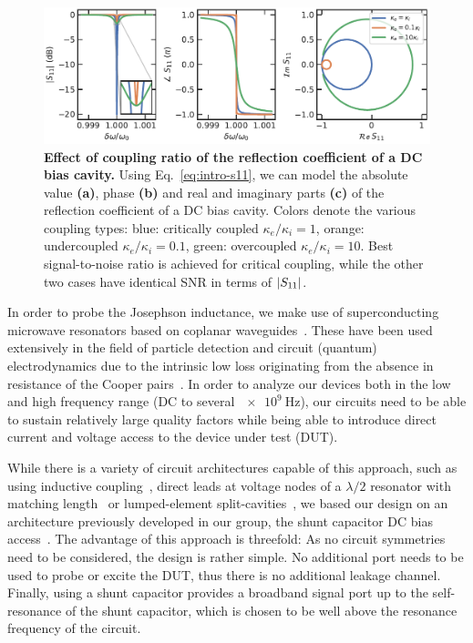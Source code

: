 \begin{figure}[t]
	\centering
	\includegraphics[width=\linewidth]{chapter-introduction/figs/model_DC_bias_cavity_coupling.pdf}
	\caption{
		\textbf{Effect of coupling ratio of the reflection coefficient of a DC bias cavity.}
		Using Eq.~\ref{eq:intro-s11}, we can model the absolute value \textbf{(a)}, phase \textbf{(b)} and real and imaginary parts \textbf{(c)} of the reflection coefficient of a DC bias cavity.
		Colors denote the various coupling types: blue: critically coupled $\kappa_e/\kappa_i=1$, orange: undercoupled $\kappa_e/\kappa_i=0.1$, green: overcoupled $\kappa_e/\kappa_i=10$.
		Best signal-to-noise ratio is achieved for critical coupling, while the other two cases have identical SNR in terms of $\lvert S_{11}\rvert$.
	}
	\label{fig:s11}
\end{figure}


In order to probe the Josephson inductance, we make use of superconducting microwave resonators based on coplanar waveguides~\cite{gopplCoplanarWaveguideResonators2008,zmuidzinasSuperconductingMicroresonatorsPhysics2012}.
%
These have been used extensively in the field of particle detection and circuit (quantum) electrodynamics due to the intrinsic low loss originating from the absence in resistance of the Cooper pairs~\cite{dayBroadbandSuperconductingDetector2003a,blaisCavityQuantumElectrodynamics2004c,clerkHybridQuantumSystems2020,blaisQuantumInformationProcessing2020}.
%
In order to analyze our devices both in the low and high frequency range (DC to several $\SI{e9}{\hertz}$), our circuits need to be able to sustain relatively large quality factors while being able to introduce direct current and voltage access to the device under test (DUT).

While there is a variety of circuit architectures capable of this approach, such as using inductive coupling~\cite{vissersFrequencytunableSuperconductingResonators2015b}, direct leads at voltage nodes of a $\lambda/2$ resonator with matching length~\cite{chenIntroductionDcBias2011a,liApplyingDirectCurrent2013} or lumped-element split-cavities~\cite{mahashabdeFastTunableHigh2020}, we based our design on an architecture previously developed in our group, the shunt capacitor DC bias access~\cite{bosmanBroadbandArchitectureGalvanically2015c}.
%
The advantage of this approach is threefold:
%
As no circuit symmetries need to be considered, the design is rather simple.
%
No additional port needs to be used to probe or excite the DUT, thus there is no additional leakage channel.
%
Finally, using a shunt capacitor provides a broadband signal port up to the self-resonance of the shunt capacitor, which is chosen to be well above the resonance frequency of the circuit.

